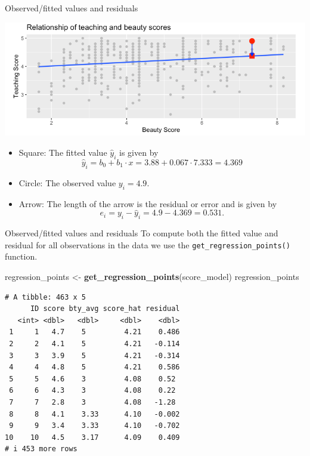 \documentclass[
  ignorenonframetext,
]{beamer}
\newenvironment{Shaded}{\begin{snugshade}}{\end{snugshade}}
\newcommand{\FunctionTok}[1]{\textcolor[rgb]{0.13,0.29,0.53}{\textbf{#1}}}
\newcommand{\NormalTok}[1]{#1}
\newcommand{\OtherTok}[1]{\textcolor[rgb]{0.56,0.35,0.01}{#1}}
\providecommand{\tightlist}{%
  \setlength{\itemsep}{0pt}\setlength{\parskip}{0pt}}
\begin{document}
\begin{frame}{Observed/fitted values and residuals}
\protect\hypertarget{observedfitted-values-and-residuals-1}{}
\begin{center}\includegraphics[width=0.8\linewidth,height=0.4\textheight]{week4_4} \end{center}

\begin{itemize}
\tightlist
\item
  Square: The fitted value \(\hat{y}_i\) is given by
  \[\hat{y}_i=b_0+b_1\cdot x=3.88+0.067\cdot 7.333=4.369\]
\item
  Circle: The observed value \(y_i=4.9\).
\item
  Arrow: The length of the arrow is the residual or error and is given
  by \[e_i=y_i-\hat{y}_i=4.9-4.369=0.531.\]
\end{itemize}
\end{frame}

\begin{frame}[fragile]{Observed/fitted values and residuals}
\protect\hypertarget{observedfitted-values-and-residuals-2}{}
To compute both the fitted value and residual for all observations in
the data we use the \texttt{get\_regression\_points()} function.

\small

\begin{Shaded}
\begin{Highlighting}[]
\NormalTok{regression\_points }\OtherTok{\textless{}{-}} \FunctionTok{get\_regression\_points}\NormalTok{(score\_model)}
\NormalTok{regression\_points}
\end{Highlighting}
\end{Shaded}

\begin{verbatim}
# A tibble: 463 x 5
      ID score bty_avg score_hat residual
   <int> <dbl>   <dbl>     <dbl>    <dbl>
 1     1   4.7    5         4.21    0.486
 2     2   4.1    5         4.21   -0.114
 3     3   3.9    5         4.21   -0.314
 4     4   4.8    5         4.21    0.586
 5     5   4.6    3         4.08    0.52 
 6     6   4.3    3         4.08    0.22 
 7     7   2.8    3         4.08   -1.28 
 8     8   4.1    3.33      4.10   -0.002
 9     9   3.4    3.33      4.10   -0.702
10    10   4.5    3.17      4.09    0.409
# i 453 more rows
\end{verbatim}

\normalsize
\end{frame}
\end{document}
